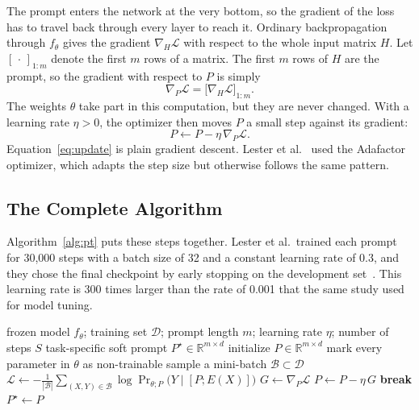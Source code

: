 \documentclass[12pt]{article}
\newcommand{\R}{\mathbb{R}}
\newcommand{\loss}{\mathcal{L}}
\newcommand{\data}{\mathcal{D}}
\newcommand{\PrTP}{\Pr\nolimits_{\theta;P}}
\begin{document}
The prompt enters the network at the very bottom, so the gradient of the loss has to travel
back through every layer to reach it. Ordinary backpropagation through $f_\theta$ gives the
gradient $\nabla_H\loss$ with respect to the whole input matrix $H$. Let $[\,\cdot\,]_{1:m}$
denote the first $m$ rows of a matrix. The first $m$ rows of $H$ are the prompt, so the
gradient with respect to $P$ is simply
\begin{equation}
  \nabla_P\loss=\bigl[\nabla_H\loss\bigr]_{1:m}.
  \label{eq:gradslice}
\end{equation}
The weights $\theta$ take part in this computation, but they are never changed. With a
learning rate $\eta>0$, the optimizer then moves $P$ a small step against its gradient:
\begin{equation}
  P\leftarrow P-\eta\,\nabla_P\loss.
  \label{eq:update}
\end{equation}
Equation~\eqref{eq:update} is plain gradient descent.
Lester et al.~\cite{lester2021} used the Adafactor optimizer, which adapts the step size but
otherwise follows the same pattern.

\subsection{The Complete Algorithm}\label{sec:algorithm}

Algorithm~\ref{alg:pt} puts these steps together. Lester et al.\ trained each prompt for
30,000 steps with a batch size of 32 and a constant learning rate of 0.3, and they chose the
final checkpoint by early stopping on the development set~\cite{lester2021}. This learning
rate is 300 times larger than the rate of 0.001 that the same study used for model tuning.

\begin{algorithm}[htbp]
  \caption{Prompt tuning of a frozen language model}
  \label{alg:pt}
  \begin{algorithmic}[1]
    \Require frozen model $f_\theta$; training set $\data$; prompt length $m$;
             learning rate $\eta$; number of steps $S$
    \Ensure task-specific soft prompt $P^{\star}\in\R^{m\times d}$
    \State initialize $P\in\R^{m\times d}$ 
    \State mark every parameter in $\theta$ as non-trainable
      \State sample a mini-batch $\mathcal{B}\subset\data$
      \State $\loss\gets-\frac{1}{|\mathcal{B}|}\sum_{(X,Y)\in\mathcal{B}}
             \log\PrTP\bigl(Y\mid[P;E(X)]\bigr)$ 
      \State $G\gets\nabla_P\loss$ 
      \State $P\gets P-\eta\,G$ 
        \State \textbf{break} 
      \EndIf
    \EndFor
    \State \Return $P^{\star}\gets P$
  \end{algorithmic}
\end{algorithm}
\end{document}
